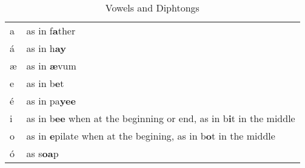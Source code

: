 \begin{table}[ht]
  \caption{Vowels and Diphtongs}
  \centering
  \begin{tabular}{ l l }
    \hline\hline
    a & as in f\textbf {a}ther  \\
    á & as in h\textbf {ay}  \\
    æ & as in \textbf{æ}vum \\
    e & as in b\textbf {e}t \\
    é & as in pa\textbf {yee} \\
    i & as in b\textbf{ee} when at the beginning or end, as in b\textbf{i}t in the middle \\
    o & as in \textbf{e}pilate when at the begining, as in b\textbf{o}t in the middle \\
    ó & as s\textbf{oa}p \\
    \hline
  \end{tabular}
  \label{table:vowels}
\end{table}